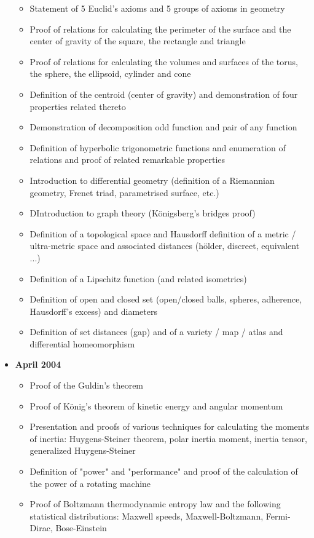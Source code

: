 \documentclass[12pt,a4paper,twoside,openright]{report}
\newcounter{def}
\theoremstyle{definition}
\theoremstyle{itexmp}
\numberwithin{equation}{section}
\begin{document}
\begin{itemize}
\begin{itemize}[noitemsep]
				\item Statement of 5 Euclid's axioms and 5 groups of axioms in geometry
				\item Proof of relations for calculating the perimeter of the surface and the center of gravity of the square, the rectangle and triangle
				\item Proof of relations for calculating the volumes and surfaces of the torus, the sphere, the ellipsoid, cylinder and cone
				\item Definition of the centroid (center of gravity) and demonstration of four properties related thereto
				\item Demonstration of decomposition odd function and pair of any function
				\item Definition of hyperbolic trigonometric functions and enumeration of relations and proof of related remarkable properties
				\item Introduction to differential geometry (definition of a Riemannian geometry, Frenet triad, parametrised surface, etc.)
				\item DIntroduction to graph theory (Königsberg's bridges proof)
				\item Definition of a topological space and Hausdorff definition of a metric / ultra-metric space and associated distances (hölder, discreet, equivalent ...)
				\item Definition of a Lipschitz function (and related isometrics)
				\item Definition of open and closed set (open/closed balls, spheres, adherence, Hausdorff's excess) and diameters
				\item Definition of set distances (gap) and of a variety / map / atlas and differential homeomorphism
			\end{itemize}
		\item \textbf{April 2004}
			\begin{itemize}[noitemsep]
				\item Proof of the Guldin's theorem
				\item Proof of König's theorem of kinetic energy and angular momentum
				\item Presentation and proofs of various techniques for calculating the moments of inertia: Huygens-Steiner theorem, polar inertia moment, inertia tensor, generalized Huygens-Steiner
				\item Definition of "power" and "performance" and proof of the calculation of the power of a rotating machine
				\item Proof of Boltzmann thermodynamic entropy law and the following statistical distributions: Maxwell speeds, Maxwell-Boltzmann, Fermi-Dirac, Bose-Einstein

\end{itemize}
\end{itemize}
\end{document}
